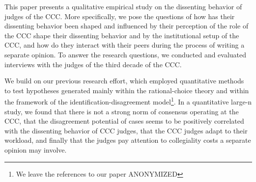 \documentclass[
  11pt,
]{article}
\begin{document}
This paper presents a qualitative empirical study on the dissenting behavior of judges of the CCC. More specifically, we pose the questions of how has their dissenting behavior been shaped and influenced by their perception of the role of the CCC shape their dissenting behavior and by the institutional setup of the CCC, and how do they interact with their peers during the process of writing a separate opinion. To answer the research questions, we conducted and evaluated interviews with the judges of the third decade of the CCC.

We build on our previous research effort, which employed quantitative methods to test hypotheses generated mainly within the rational-choice theory and within the framework of the identification-disagreement model\footnote{We leave the references to our paper ANONYMIZED}. In a quantitative large-n study, we found that there is not a strong norm of consensus operating at the CCC, that the disagreement potential of cases seems to be positively correlated with the dissenting behavior of CCC judges, that the CCC judges adapt to their workload, and finally that the judges pay attention to collegiality costs a separate opinion may involve.
\end{document}
